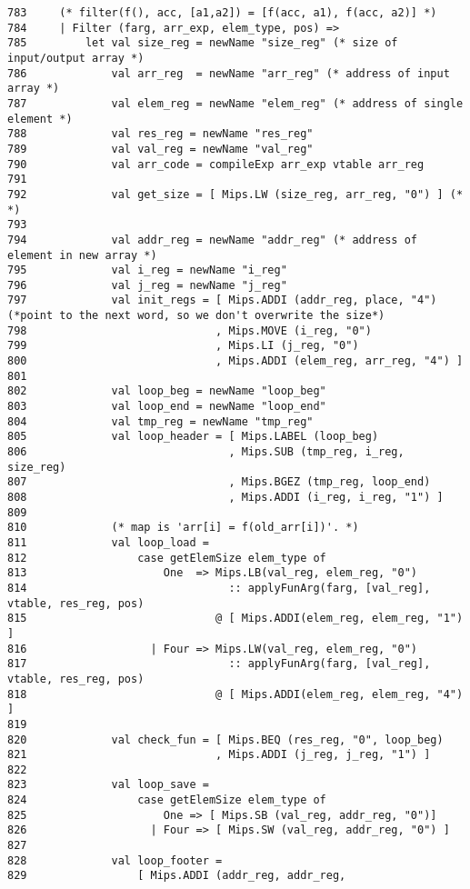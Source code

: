 \documentclass[paper=a4, fontsize=11pt]{scrartcl} %
\numberwithin{equation}{section} %
\numberwithin{figure}{section} %
\numberwithin{table}{section} %
\begin{document}
\begin{lstlisting}
783	    (* filter(f(), acc, [a1,a2]) = [f(acc, a1), f(acc, a2)] *) 
784	    | Filter (farg, arr_exp, elem_type, pos) => 
785	        let val size_reg = newName "size_reg" (* size of input/output array *) 
786	            val arr_reg  = newName "arr_reg" (* address of input array *) 
787	            val elem_reg = newName "elem_reg" (* address of single element *) 
788	            val res_reg = newName "res_reg" 
789	            val val_reg = newName "val_reg" 
790	            val arr_code = compileExp arr_exp vtable arr_reg 
791	 
792	            val get_size = [ Mips.LW (size_reg, arr_reg, "0") ] (* *) 
793	 
794	            val addr_reg = newName "addr_reg" (* address of element in new array *) 
795	            val i_reg = newName "i_reg" 
796	            val j_reg = newName "j_reg" 
797	            val init_regs = [ Mips.ADDI (addr_reg, place, "4") (*point to the next word, so we don't overwrite the size*) 
798	                            , Mips.MOVE (i_reg, "0") 
799	                            , Mips.LI (j_reg, "0") 
800	                            , Mips.ADDI (elem_reg, arr_reg, "4") ] 
801	 
802	            val loop_beg = newName "loop_beg" 
803	            val loop_end = newName "loop_end" 
804	            val tmp_reg = newName "tmp_reg" 
805	            val loop_header = [ Mips.LABEL (loop_beg) 
806	                              , Mips.SUB (tmp_reg, i_reg, size_reg) 
807	                              , Mips.BGEZ (tmp_reg, loop_end) 
808	                              , Mips.ADDI (i_reg, i_reg, "1") ] 
809	 
810	            (* map is 'arr[i] = f(old_arr[i])'. *) 
811	            val loop_load = 
812	                case getElemSize elem_type of 
813	                    One  => Mips.LB(val_reg, elem_reg, "0") 
814	                              :: applyFunArg(farg, [val_reg], vtable, res_reg, pos) 
815	                            @ [ Mips.ADDI(elem_reg, elem_reg, "1") ] 
816	                  | Four => Mips.LW(val_reg, elem_reg, "0") 
817	                              :: applyFunArg(farg, [val_reg], vtable, res_reg, pos) 
818	                            @ [ Mips.ADDI(elem_reg, elem_reg, "4") ] 
819	             
820	            val check_fun = [ Mips.BEQ (res_reg, "0", loop_beg) 
821	                            , Mips.ADDI (j_reg, j_reg, "1") ] 
822	 
823	            val loop_save = 
824	                case getElemSize elem_type of 
825	                    One => [ Mips.SB (val_reg, addr_reg, "0")] 
826	                  | Four => [ Mips.SW (val_reg, addr_reg, "0") ] 
827	 
828	            val loop_footer = 
829	                [ Mips.ADDI (addr_reg, addr_reg, 

\end{lstlisting}
\end{document}

